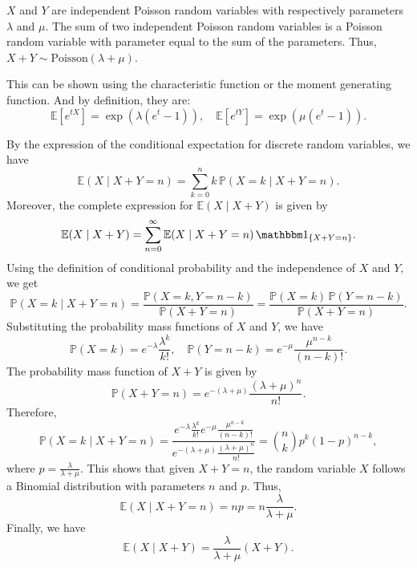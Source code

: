 \begin{answer}
    \rpos
    \begin{answerenum}
        \item \(X\) and \(Y\) are independent Poisson random variables with respectively 
            parameters \(\lambda\) and \(\mu\). The sum of two independent Poisson random variables is a Poisson random variable with parameter equal to the sum of the parameters. 
            Thus, \(X + Y \sim \text{Poisson}(\lambda + \mu)\).

            This can be shown using the characteristic function or the moment generating function.
            And by definition, they are:
            \[
                \mathbb{E}[e^{tX}] = \exp(\lambda(e^t - 1)), \quad \mathbb{E}[e^{tY}] = \exp(\mu(e^t - 1)).
            \]
        \item By the expression of the conditional expectation for discrete random variables, we have
            \[
                \mathbb{E}(X \mid X + Y = n) = \sum_{k=0}^n k \, \mathbb{P}(X = k \mid X + Y = n).
            \]
            Moreover, the complete expression for \(\mathbb{E}(X \mid X + Y)\) is given by
            \[
                \mathbb{E}(X \mid X + Y) = \sum_{n=0}^{\infty} \mathbb{E}(X \mid X + Y = n) \, \ind_{\{X + Y = n\}}.
            \]
            Using the definition of conditional probability and the independence of \(X\) and \(Y\), we get
            \[
                \mathbb{P}(X = k \mid X + Y = n) = \frac{\mathbb{P}(X = k, Y = n - k)}{\mathbb{P}(X + Y = n)} = \frac{\mathbb{P}(X = k) \, \mathbb{P}(Y = n - k)}{\mathbb{P}(X + Y = n)}.
            \]
            Substituting the probability mass functions of \(X\) and \(Y\), we have
            \[
                \mathbb{P}(X = k) = e^{-\lambda} \frac{\lambda^k}{k!}, \quad \mathbb{P}(Y = n - k) = e^{-\mu} \frac{\mu^{n - k}}{(n - k)!}.
            \]
            The probability mass function of \(X + Y\) is given by
            \[
                \mathbb{P}(X + Y = n) = e^{-(\lambda + \mu)} \frac{(\lambda + \mu)^n}{n!}.
            \]
            Therefore,
            \[
                \mathbb{P}(X = k \mid X + Y = n) = \frac{e^{-\lambda} \frac{\lambda^k}{k!} e^{-\mu} \frac{\mu^{n - k}}{(n - k)!}}{e^{-(\lambda + \mu)} \frac{(\lambda + \mu)^n}{n!}} = \binom{n}{k} p^k (1 - p)^{n - k},
            \]
            where \(p = \frac{\lambda}{\lambda + \mu}\). This shows that given \(X + Y = n\), the random variable \(X\) follows a Binomial distribution with parameters \(n\) and \(p\). Thus,
            \[
                \mathbb{E}(X \mid X + Y = n) = np = n \frac{\lambda}{\lambda + \mu}.
            \]
            Finally, we have
            \[
                \mathbb{E}(X \mid X + Y) = \frac{\lambda}{\lambda + \mu} (X + Y).
            \]  
    \end{answerenum}
\end{answer}

